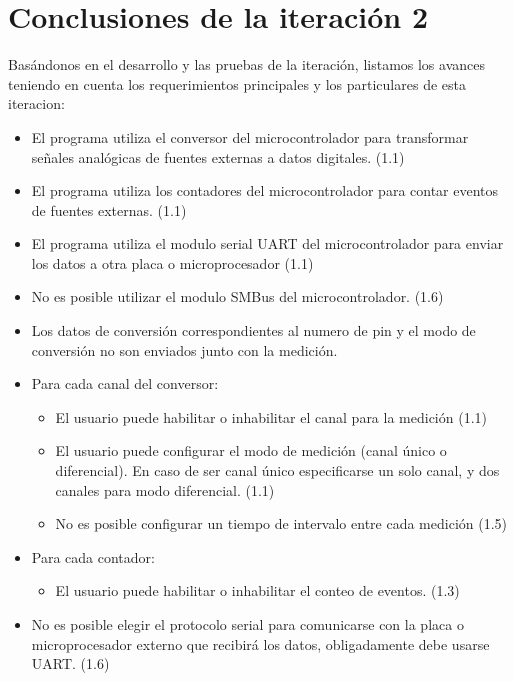 \section{Conclusiones de la iteración 2} %
\label{it2:sec:conclusiones_de_la_iteracion_2}

Basándonos en el desarrollo y las pruebas de la iteración, listamos los avances teniendo en cuenta los requerimientos principales y los particulares de esta iteracion:

\begin{itemize}
\item El programa utiliza el conversor del microcontrolador para transformar señales analógicas de fuentes externas a datos digitales. (1.1)
\item El programa utiliza los contadores del microcontrolador para contar eventos de fuentes externas. (1.1)
\item El programa utiliza el modulo serial UART del microcontrolador para enviar los datos a otra placa o microprocesador (1.1)
\item No es posible utilizar el modulo SMBus del microcontrolador. (1.6)
\item Los datos de conversión correspondientes al numero de pin y el modo de conversión no son enviados junto con la medición. 
\item Para cada canal del conversor:
\begin{itemize}
\item El usuario puede habilitar o inhabilitar el canal para la medición (1.1)
\item El usuario puede configurar el modo de medición (canal único o diferencial). En caso de ser canal único especificarse un solo canal, y dos canales para modo diferencial. (1.1)
\item No es posible configurar un tiempo de intervalo entre cada medición (1.5)
\end{itemize}
\item Para cada contador:
\begin{itemize}
\item El usuario puede habilitar o inhabilitar el conteo de eventos. (1.3)
\end{itemize}
\item No es posible elegir el protocolo serial para comunicarse con la placa o microprocesador externo que recibirá los datos, obligadamente debe usarse UART. (1.6)

\end{itemize}

